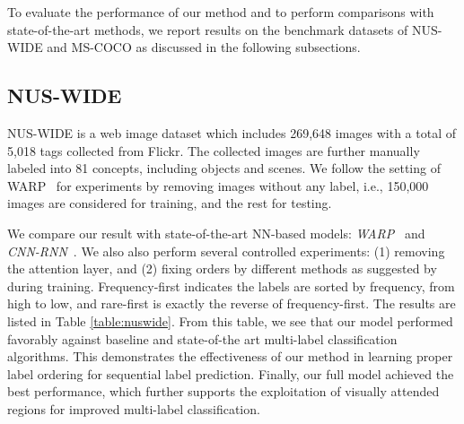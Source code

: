 \documentclass[letterpaper]{article} %
\begin{document}
To evaluate the performance of our method and to perform comparisons with state-of-the-art methods, we report results on the benchmark datasets of NUS-WIDE and MS-COCO as discussed in the following subsections.\\ 
\subsection{NUS-WIDE}

NUS-WIDE is a web image dataset which includes 269,648 images with a total of 5,018 tags collected from Flickr. The collected images are further manually labeled into 81 concepts, including objects and scenes. We follow the setting of WARP~\cite{gong2013deep} for experiments by removing images without any label, i.e., 150,000 images are considered for training, and the rest for testing. 

We compare our result with state-of-the-art NN-based models: \textit{WARP}~\cite{gong2013deep} and \textit{CNN-RNN}~\cite{wang2016cnn}. We also also perform several controlled experiments: (1) removing the attention layer, and (2) fixing orders by different methods as suggested by~\cite{jin2016annotation} during training. Frequency-first indicates the labels are sorted by frequency, from high to low, and rare-first is exactly the reverse of frequency-first. The results are listed in Table \ref{table:nuswide}. From this table, we see that our model performed favorably against baseline and state-of-the art multi-label classification algorithms. This demonstrates the effectiveness of our method in learning proper label ordering for sequential label prediction. Finally, our full model achieved the best performance, which further supports the exploitation of visually attended regions for improved multi-label classification.
\end{document}

